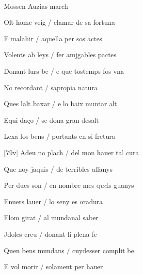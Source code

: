 \documentclass[12pt]{article}
\renewcommand{\espaiAbansEtiquetaPoema}{\vspace{0ex}}
\begin{document}
\begin{estrofa}

\espaiAbansEtiquetaPoema

\\

\begin{rubrica}

Mossen Auzias march

\end{rubrica}

\end{estrofa}


\begin{estrofa}

 Olt home veig / clamar de sa fortuna

 E malahir / aquella per sos actes

 Volents ab leys / fer amjgables pactes

 Donant lurs be / e que tostemps fos vna

 No recordant / sapropia natura

 Ques lalt baxar / e lo baix muntar alt

 Equi da\c{c}o / se dona gran desalt

 Lexa los bens / portants en si fretura

\end{estrofa}



\begin{estrofa}

 [79v] Adeu no plach / del mon hauer tal cura

 Que noy jaquis / de terribles affanys

 Per dues son / en nombre mes q\textit{ue}ls guanys

 Enuers lauer / lo seny es oradura

 Elom girat / al mundanal saber

 Jdoles creu / donant li plena fe

 Quen bens mundans / cuydesser complit be

 E vol morir / solament per hauer

\end{estrofa}
\end{document}
